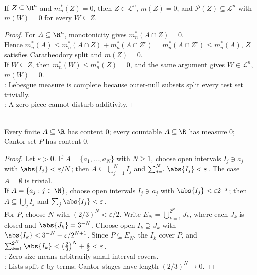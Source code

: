 \begin{proposition} \label{prop:outer-null-sets-lebesgue-measurable} \\
If $Z\subseteq\R^n$ and $m_n^\ast(Z)=0$, then $Z\in\mathcal{L}^n$, $m(Z)=0$, and $\mathcal{P}(Z)\subseteq\mathcal{L}^n$ with $m(W)=0$ for every $W\subseteq Z$.
\begin{proof}
For $A\subseteq\R^n$, monotonicity gives $m_n^\ast(A\cap Z)=0$.\\
Hence $m_n^\ast(A)\leq m_n^\ast(A\cap Z)+m_n^\ast(A\cap Z^c)=m_n^\ast(A\cap Z^c)\leq m_n^\ast(A)$, $Z$ satisfies Caratheodory split and $m(Z)=0$.\\
If $W\subseteq Z$, then $m_n^\ast(W)\leq m_n^\ast(Z)=0$, and the same argument gives $W\in\mathcal{L}^n$, $m(W)=0$.\\
: Lebesgue measure is complete because outer-null subsets split every test set trivially.\\
: A zero piece cannot disturb additivity.
\end{proof}
\end{proposition}

\begin{proposition} \label{prop:finite-countable-cantor-null-sets} \\
Every finite $A\subseteq\R$ has content $0$; every countable $A\subseteq\R$ has measure $0$; Cantor set $P$ has content $0$.
\begin{proof}
Let $\varepsilon>0$. If $A=\{a_1,\ldots,a_N\}$ with $N\geq1$, choose open intervals $I_j\ni a_j$ with $\abs{I_j}<\varepsilon/N$; then $A\subseteq\bigcup_{j=1}^NI_j$ and $\sum_{j=1}^N\abs{I_j}<\varepsilon$. The case $A=\emptyset$ is trivial.\\
If $A=\{a_j:j\in\N\}$, choose open intervals $I_j\ni a_j$ with $\abs{I_j}<\varepsilon 2^{-j}$; then $A\subseteq\bigcup_jI_j$ and $\sum_j\abs{I_j}<\varepsilon$.\\
For $P$, choose $N$ with $(2/3)^N<\varepsilon/2$. Write $E_N=\bigcup_{k=1}^{2^N}J_k$, where each $J_k$ is closed and $\abs{J_k}=3^{-N}$. Choose open $I_k\supseteq J_k$ with $\abs{I_k}<3^{-N}+\varepsilon/2^{N+1}$. Since $P\subseteq E_N$, the $I_k$ cover $P$, and $\sum_{k=1}^{2^N}\abs{I_k}<\left(\frac23\right)^N+\frac{\varepsilon}{2}<\varepsilon$.\\
: Zero size means arbitrarily small interval covers.\\
: Lists split $\varepsilon$ by terms; Cantor stages have length $(2/3)^N\to0$.
\end{proof}
\end{proposition}

